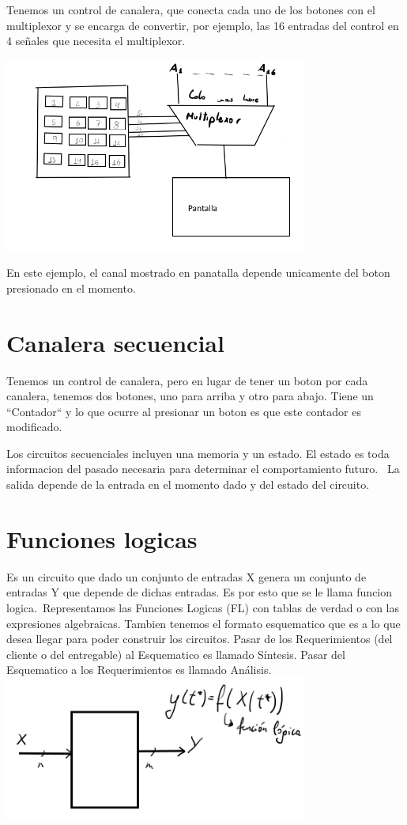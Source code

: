 \documentclass{report}
\begin{document}
Tenemos un control de canalera, que conecta cada uno de los botones con el multiplexor y se encarga de convertir, por ejemplo, las 16 entradas del control en 4 señales que necesita el multiplexor.

\includegraphics[width=10cm]{../Assets/canalera_combinatoria_19-03-24.png}

En este ejemplo, el canal mostrado en panatalla depende unicamente del boton presionado en el momento.

\section{Canalera secuencial}

Tenemos un control de canalera, pero en lugar de tener un boton por cada canalera, tenemos dos botones, uno para arriba y otro para abajo.
Tiene un ``Contador`` y lo que ocurre al presionar un boton es que este contador es modificado.

Los circuitos secuenciales incluyen una memoria y un estado.
El estado es toda informacion del pasado necesaria para determinar el comportamiento futuro. \
La salida depende de la entrada en el momento dado y del estado del circuito.



\section{Funciones logicas}

Es un circuito que dado un conjunto de entradas X genera un conjunto de entradas Y que depende de dichas entradas. Es por esto que se le llama funcion logica.\
Representamos las Funciones Logicas (FL) con tablas de verdad o con las expresiones algebraicas. Tambien tenemos el formato esquematico que es a lo que desea llegar para poder construir los circuitos.
Pasar de los Requerimientos (del cliente o del entregable) al Esquematico es llamado Síntesis. Pasar del Esquematico a los Requerimientos es llamado Análisis.
\includegraphics[width=10cm]{../Assets/circuitos_combinatorios2.png}
\end{document}
